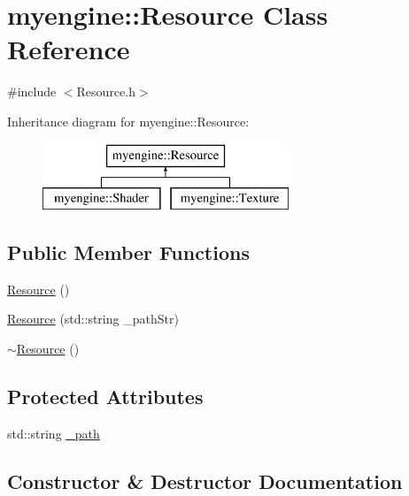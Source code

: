 \hypertarget{classmyengine_1_1_resource}{}\section{myengine\+:\+:Resource Class Reference}
\label{classmyengine_1_1_resource}


{\ttfamily \#include $<$Resource.\+h$>$}

Inheritance diagram for myengine\+:\+:Resource\+:\begin{figure}[H]
\begin{center}
\leavevmode
\includegraphics[height=2.000000cm]{classmyengine_1_1_resource}
\end{center}
\end{figure}
\subsection*{Public Member Functions}
\begin{DoxyCompactItemize}
\item 
\hyperlink{classmyengine_1_1_resource_ab6fa75b1f7c8c76714987e99560feb1f}{Resource} ()
\item 
\hyperlink{classmyengine_1_1_resource_a9201d21cadaff21f148143b508e8d667}{Resource} (std\+::string \+\_\+path\+Str)
\item 
\hyperlink{classmyengine_1_1_resource_a450384125daf3876d16ee6f655dce578}{$\sim$\+Resource} ()
\end{DoxyCompactItemize}
\subsection*{Protected Attributes}
\begin{DoxyCompactItemize}
\item 
std\+::string \hyperlink{classmyengine_1_1_resource_af7057ebf099efbd80751c64d25c2c83d}{\+\_\+path}
\end{DoxyCompactItemize}


\subsection{Constructor \& Destructor Documentation}
\mbox{\label{classmyengine_1_1_resource_ab6fa75b1f7c8c76714987e99560feb1f}} 

